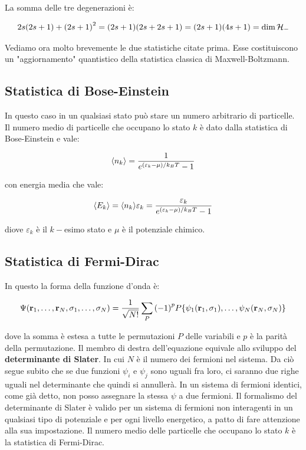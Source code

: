 	La somma delle tre degenerazioni è:
	
\begin{align*}
	2s \qty(2s + 1) + \qty(2s + 1)^2 = \qty(2s + 1) \qty(2s + 2s +1 ) = \qty(2s + 1) \qty(4s +1) = \text{dim} \, \mathcal{H}_-
\end{align*}

	Vediamo ora molto brevemente le due statistiche citate prima. Esse costituiscono un "aggiornamento" quantistico della statistica classica di Maxwell-Boltzmann.
	
\subsection{Statistica di Bose-Einstein}

	In questo caso in un qualsiasi stato può stare un numero arbitrario di particelle. Il numero medio di particelle che occupano lo stato $k$ è dato dalla statistica di Bose-Einstein e vale:
	
\begin{align*}
	\langle n_k \rangle = \frac{1}{e^{\qty(\varepsilon_k - \mu)/k_B T} - 1}
\end{align*}
	
	con energia media che vale:
	
\begin{align*}
	\langle E_k \rangle = \langle n_k \rangle \varepsilon_k = \frac{\varepsilon_k}{e^{\qty(\varepsilon_k - \mu)/k_B T} - 1}
\end{align*}

	diove $\varepsilon_k$ è il $k-$esimo stato e $\mu$ è il potenziale chimico.

\subsection{Statistica di Fermi-Dirac}

	In questo la forma della funzione d'onda è:
	
\begin{align*}
	\Psi\qty(\vb{r}_1, \dots, \vb{r}_N, \sigma_1, \dots, \sigma_N) = \frac{1}{\sqrt{N!}} \sum_P \qty(-1)^p P\qty{\psi_1\qty(\vb{r}_1, \sigma_1), \dots, \psi_N\qty(\vb{r}_N, \sigma_N)}
\end{align*}

	dove la somma è estesa a tutte le permutazioni $P$ delle variabili e $p$ è la parità della permutazione. Il membro di destra dell’equazione equivale allo sviluppo del \textbf{determinante di Slater}. In cui $N$ è il numero dei fermioni nel sistema. Da ciò segue subito che se due funzioni $\psi_i$ e $\psi_j$ sono uguali fra loro, ci saranno due righe uguali nel determinante che quindi si annullerà. In un sistema di fermioni identici, come già detto, non posso assegnare la stessa $\psi$ a due fermioni. Il formalismo del determinante di Slater è valido per un sistema di fermioni non interagenti in un qualsiasi tipo di potenziale e per ogni livello energetico, a patto di fare attenzione alla sua impostazione. Il numero medio delle particelle che occupano lo stato $k$ è la statistica di Fermi-Dirac.

